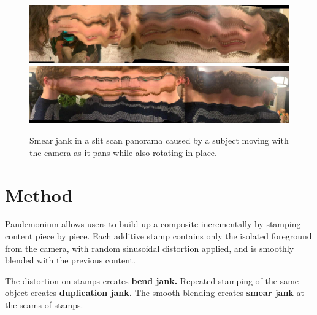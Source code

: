 \documentclass[twocolumn]{article}
\begin{document}
\begin{figure}
    \centering
    \includegraphics[width=0.98\linewidth]{img/badpano2.jpg}
    \includegraphics[width=0.98\linewidth]{img/badpano3.jpg}
    \caption{Smear jank in a slit scan panorama caused by a subject moving with the camera as it pans while also rotating in place.}
    \label{fig:smearpano}
\end{figure}

\section{Method}

Pandemonium allows users to build up a composite incrementally by stamping content piece by piece. Each additive stamp contains only the isolated foreground from the camera, with random sinusoidal distortion applied, and is smoothly blended with the previous content.

The distortion on stamps creates \textbf{bend jank.} Repeated stamping of the same object creates \textbf{duplication jank.} The smooth blending creates \textbf{smear jank} at the seams of stamps.
\end{document}
